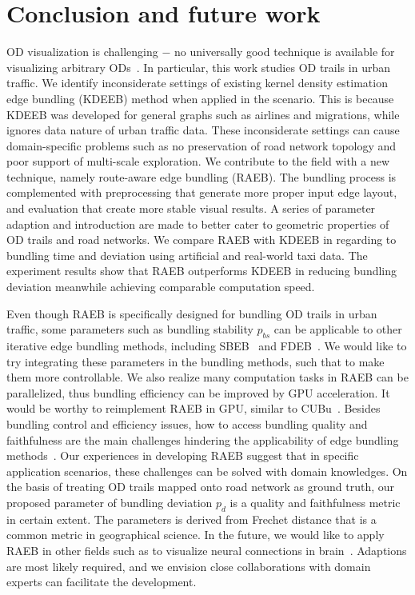 \section{Conclusion and future work}
\label{sec:con}

OD visualization is challenging $-$ no universally good technique is available for visualizing arbitrary ODs~\cite{andrienko_visual_2012}.
In particular, this work studies OD trails in urban traffic.
We identify inconsiderate settings of existing kernel density estimation edge bundling (KDEEB) method when applied in the scenario.
This is because KDEEB was developed for general graphs such as airlines and migrations, while ignores data nature of urban traffic data.
These inconsiderate settings can cause domain-specific problems such as no preservation of road network topology and poor support of multi-scale exploration.
We contribute to the field with a new technique, namely route-aware edge bundling (RAEB). 
The bundling process is complemented with preprocessing that generate more proper input edge layout, and evaluation that create more stable visual results.
A series of parameter adaption and introduction are made to better cater to geometric properties of OD trails and road networks.
We compare RAEB with KDEEB in regarding to bundling time and deviation using artificial and real-world taxi data.
The experiment results show that RAEB outperforms KDEEB in reducing bundling deviation meanwhile achieving comparable computation speed.

Even though RAEB is specifically designed for bundling OD trails in urban traffic, some parameters such as bundling stability $p_{bs}$ can be applicable to other iterative edge bundling methods, including SBEB~\cite{ersoy2011skeleton} and FDEB~\cite{holten2009force}.
We would like to try integrating these parameters in the bundling methods, such that to make them more controllable.
We also realize many computation tasks in RAEB can be parallelized, thus bundling efficiency can be improved by GPU acceleration.
It would be worthy to reimplement RAEB in GPU, similar to CUBu~\cite{van2016cubu}.
Besides bundling control and efficiency issues, how to access bundling quality and faithfulness are the main challenges hindering the applicability of edge bundling methods~\cite{lhuillier2017state}.
Our experiences in developing RAEB suggest that in specific application scenarios, these challenges can be solved with domain knowledges.
On the basis of treating OD trails mapped onto road network as ground truth, our proposed parameter of bundling deviation $p_d$ is a quality and faithfulness metric in certain extent.
The parameters is derived from Frechet distance that is a common metric in geographical science.
In the future, we would like to apply RAEB in other fields such as to visualize neural connections in brain~\cite{2014_bottger_three-d, yang2016blockwise}.
Adaptions are most likely required, and we envision close collaborations with domain experts can facilitate the development.
